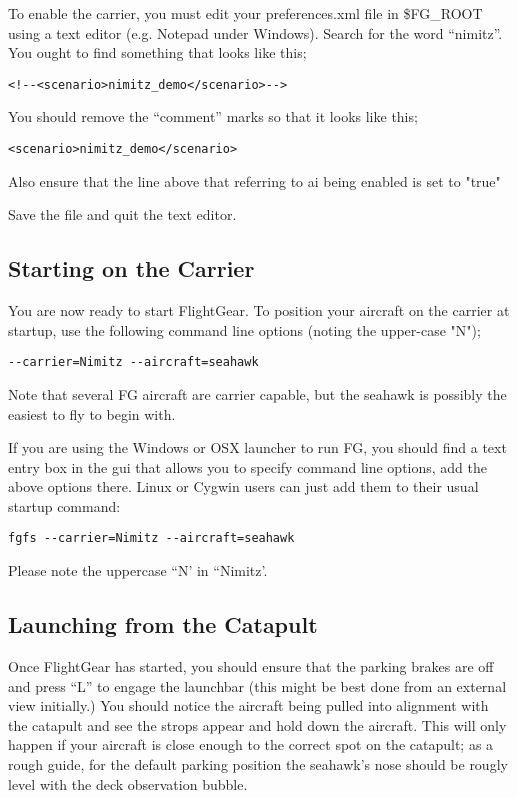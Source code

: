 To enable the carrier, you must edit your preferences.xml file in \$FG\_ROOT using a text editor (e.g. Notepad
under Windows). Search for the word ``nimitz''. You ought to find something that looks like this;

\begin{verbatim}
<!--<scenario>nimitz_demo</scenario>--> 
\end{verbatim}

You should remove the ``comment'' marks so that it looks like this;


\begin{verbatim}
<scenario>nimitz_demo</scenario> 
\end{verbatim}

Also ensure that the line above that referring to ai being enabled is set to "true"

Save the file and quit the text editor.

\subsection{Starting on the Carrier}

You are now ready to start FlightGear. To position your aircraft on the carrier at startup, 
use the following command line options (noting the upper-case "N");

\begin{verbatim}
--carrier=Nimitz --aircraft=seahawk 
\end{verbatim}

Note that several FG aircraft are carrier capable, but the seahawk is possibly the easiest to fly to begin with.

If you are using the Windows or OSX launcher to run FG, you should find a text entry box in the gui that 
allows you to specify command line options, add the above options there. Linux or Cygwin users can just 
add them to their usual startup command: 

\begin{verbatim}
fgfs --carrier=Nimitz --aircraft=seahawk
\end{verbatim}

Please note the uppercase ``N' in ``Nimitz'.

\subsection{Launching from the Catapult}

Once FlightGear has started, you should ensure that the parking brakes are off and press ``L'' to engage the launchbar 
(this might be best done from an external view initially.)  You should notice the aircraft being pulled 
into alignment with the catapult and see the strops appear and hold down the aircraft.  
This will only happen if your aircraft is close enough to the correct spot on the catapult; 
as a rough guide, for the default parking position the seahawk's nose should be rougly level with the deck observation bubble.




